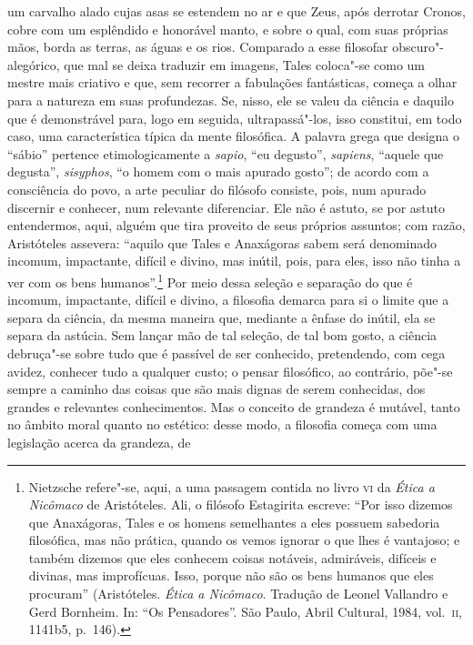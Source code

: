 um carvalho alado cujas asas se estendem no ar e que Zeus, após
derrotar Cronos, cobre com um esplêndido e honorável manto, e sobre
o qual, com suas próprias mãos, borda as terras, as águas e os rios.
Comparado a esse filosofar obscuro"-alegórico, que mal se deixa traduzir
em imagens, Tales coloca"-se como um mestre mais criativo e que, sem
recorrer a fabulações fantásticas, começa a olhar para a natureza em
suas profundezas. Se, nisso, ele se valeu da ciência e daquilo que é
demonstrável para, logo em seguida, ultrapassá"-los, isso constitui, em
todo caso, uma característica típica da mente filosófica. A palavra
grega que designa o ``sábio'' pertence etimologicamente a \textit{sapio},
``eu degusto'', \textit{sapiens}, ``aquele que degusta'',
\textit{sisyphos}, ``o homem com o mais apurado gosto''; de acordo com a
consciência do povo, a arte peculiar do filósofo consiste, pois, num
apurado discernir e conhecer, num relevante diferenciar. Ele não é
astuto, se por astuto entendermos, aqui, alguém que tira proveito de
seus próprios assuntos; com razão, Aristóteles assevera: ``aquilo que
Tales e Anaxágoras sabem será denominado incomum, impactante, difícil e
divino, mas inútil, pois, para eles, isso não tinha a ver com os bens
humanos''.\footnote{ Nietzsche refere"-se, aqui, a uma passagem contida
no livro \textsc{vi} da \textit{Ética a Nicômaco} de Aristóteles. Ali, o
filósofo Estagirita escreve: ``Por isso dizemos que Anaxágoras, Tales e
os homens semelhantes a eles possuem sabedoria filosófica, mas não
prática, quando os vemos ignorar o que lhes é vantajoso; e também
dizemos que eles conhecem coisas notáveis, admiráveis, difíceis e
divinas, mas improfícuas. Isso, porque não são os bens humanos que eles
procuram'' (Aristóteles. \textit{Ética a Nicômaco}. Tradução de Leonel
Vallandro e Gerd Bornheim. In: ``Os Pensadores''. São Paulo, Abril
Cultural, 1984, vol.~\textsc{ii}, 1141b5, p.~146).} Por meio dessa
seleção e separação do que é incomum, impactante, difícil e divino, a
filosofia demarca para si o limite que a separa da ciência, da mesma
maneira que, mediante a ênfase do inútil, ela se separa da astúcia. Sem
lançar mão de tal seleção, de tal bom gosto, a ciência debruça"-se sobre
tudo que é passível de ser conhecido, pretendendo, com cega avidez,
conhecer tudo a qualquer custo; o pensar filosófico, ao contrário,
põe"-se sempre a caminho das coisas que são mais dignas de serem
conhecidas, dos grandes e relevantes conhecimentos. Mas o conceito de
grandeza é mutável, tanto no âmbito moral quanto no estético: desse
modo, a filosofia começa com uma legislação acerca da grandeza, de
